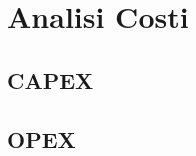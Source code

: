 \chapter[Analisi Costi]{Analisi Costi}



\section[CAPEX]{CAPEX}
	
\clearpage
\section[OPEX]{OPEX}
	
